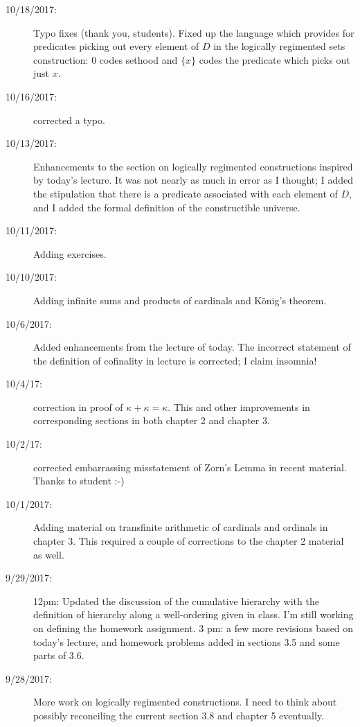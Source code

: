 \documentclass[12pt]{book}
\begin{document}
{\begin{description}
\item[10/18/2017:]  Typo fixes (thank you, students).  Fixed up the language which provides for predicates picking out every element of $D$ in the logically regimented sets construction:  0 codes sethood and $\{x\}$ codes the predicate which picks out just $x$.

\item[10/16/2017:]  corrected a typo.

\item[10/13/2017:]  Enhancements to the section on logically regimented constructions inspired by today's lecture.   It was not nearly as much in error as I thought;  I added the stipulation that there is a predicate associated with each element of $D$, and I added the formal definition of the constructible universe.

\item[10/11/2017:]  Adding exercises.

\item[10/10/2017:]  Adding infinite sums and products of cardinals and K\"onig's theorem.

\item[10/6/2017:]  Added enhancements from the lecture of today.  The incorrect statement of the definition of cofinality in lecture is corrected; I claim insomnia!

\item[10/4/17:]  correction in proof of $\kappa+\kappa=\kappa$.  This and other improvements in corresponding sections in both chapter 2 and chapter 3.

\item[10/2/17:]  corrected embarrassing misstatement of Zorn's Lemma in recent material.  Thanks to student :-)

\item[10/1/2017:]  Adding material on transfinite arithmetic of cardinals and ordinals in chapter 3.  This required a couple of corrections to the chapter 2 material as well.

\item[9/29/2017:]  12pm:  Updated the discussion of the cumulative hierarchy with the definition of hierarchy along a well-ordering given in class.  I'm still working on defining the homework assignment.  3 pm:  a few more revisions based on today's lecture, and homework problems added in sections 3.5 and some parts of 3.6.

\item[9/28/2017:]  More work on logically regimented constructions.  I need to think about possibly reconciling the current section 3.8 and chapter 5 eventually.


\end{description}}
\end{document}
